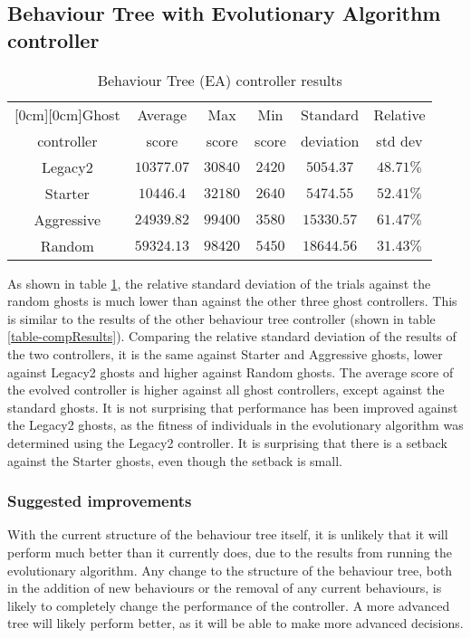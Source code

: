 \subsection{Behaviour Tree with Evolutionary Algorithm controller}
\begin{table}[h]
\caption{Behaviour Tree (EA) controller results}
\begin{center}
\begin{tabular}{|c|c|c|c|c|c|}
\hline
\multicolumn{1}{|c|}{\raisebox{-0.50ex}[0cm][0cm]{\!Ghost\!}}
& \multicolumn{1}{|c|}{Average}
& \multicolumn{1}{|c|}{Max}
& \multicolumn{1}{|c|}{Min} 
& \multicolumn{1}{|c|}{Standard}
& \multicolumn{1}{|c|}{Relative}\\
controller & score & score & score & deviation & std dev \\ \hline
Legacy2 &  $10377.07$  &  $30840$  &  $2420$ & $5054.37$ & $48.71\%$\\ \hline
Starter &  $10446.4$  &  $32180$  &  $2640$ & $5474.55$ & $52.41\%$\\ \hline
Aggressive &  $24939.82$  &  $99400$  &  $3580$ & $15330.57$ & $61.47\%$\\ \hline
Random &  $59324.13$  &  $98420$  &  $5450$ & $18644.56$ & $31.43\%$\\ \hline
\end{tabular}
\label{table-bteaResults}
\end{center}
\end{table}

As shown in table \ref{table-bteaResults}, the relative standard deviation of the trials against the random ghosts is much lower than against the other three ghost controllers. This is similar to the results of the other behaviour tree controller (shown in table \ref{table-compResults}). Comparing the relative standard deviation of the results of the two controllers, it is the same against Starter and Aggressive ghosts, lower against Legacy2 ghosts and higher against Random ghosts. The average score of the evolved controller is higher against all ghost controllers, except against the standard ghosts. It is not surprising that performance has been improved against the Legacy2 ghosts, as the fitness of individuals in the evolutionary algorithm was determined using the Legacy2 controller. It is surprising that there is a setback against the Starter ghosts, even though the setback is small.

\subsubsection{Suggested improvements}
With the current structure of the behaviour tree itself, it is unlikely that it will perform much better than it currently does, due to the results from running the evolutionary algorithm. Any change to the structure of the behaviour tree, both in the addition of new behaviours or the removal of any current behaviours, is likely to completely change the performance of the controller. A more advanced tree will likely perform better, as it will be able to make more advanced decisions.

